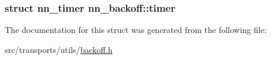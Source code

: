 \subsubsection[{timer}]{\setlength{\rightskip}{0pt plus 5cm}struct {\bf nn\+\_\+timer} nn\+\_\+backoff\+::timer}\hypertarget{structnn__backoff_a95e67b73fd37ef3528d06f3c7567869e}{}\label{structnn__backoff_a95e67b73fd37ef3528d06f3c7567869e}


The documentation for this struct was generated from the following file\+:\begin{DoxyCompactItemize}
\item 
src/transports/utils/\hyperlink{backoff_8h}{backoff.\+h}\end{DoxyCompactItemize}
